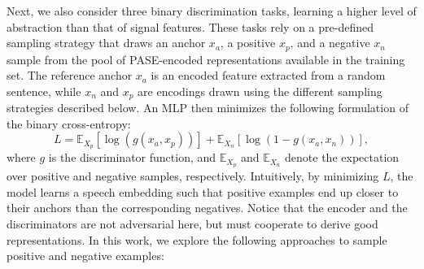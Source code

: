 \documentclass[a4paper]{article}
\begin{document}
Next, we also consider three binary discrimination tasks, learning a higher level of abstraction than that of signal features. These tasks rely on a pre-defined sampling strategy that draws an anchor $x_{a}$, a positive $x_{p}$, and a negative $x_{n}$ sample from the pool of PASE-encoded representations available in the training set. The reference anchor $x_{a}$ is an encoded feature extracted from a random sentence, while $x_{n}$ and $x_{p}$ are encodings drawn using the different sampling strategies described below. An MLP then minimizes the following formulation of the binary cross-entropy:
\begin{equation*}
\label{eq:ce}
L= \mathbb{E}_{X_p}[\log(g(x_a,x_p))] + \mathbb{E}_{X_n}[\log(1-g(x_a,x_{n}))],
\end{equation*}
where $g$ is the discriminator function, and $\mathbb{E}_{X_p}$ and $\mathbb{E}_{X_n}$ denote the expectation over positive and negative samples, respectively. Intuitively, by minimizing $L$, the model learns a speech embedding such that positive examples end up closer to their anchors than the corresponding negatives. Notice that the encoder and the discriminators are not adversarial here, but must cooperate to derive good representations.
In this work, we explore the following approaches to sample positive and negative examples:
\end{document}
